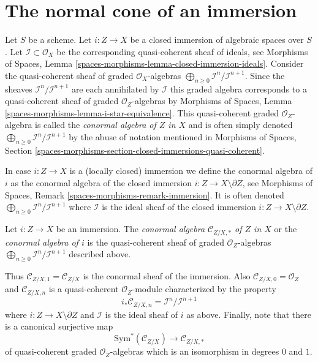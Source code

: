 \section{The normal cone of an immersion}
\label{section-normal-cone}

\noindent
Let $S$ be a scheme. Let $i : Z \to X$ be a closed immersion of algebraic
spaces over $S$. Let $\mathcal{I} \subset \mathcal{O}_X$ be the
corresponding quasi-coherent sheaf of ideals, see
Morphisms of Spaces, Lemma
\ref{spaces-morphisms-lemma-closed-immersion-ideals}.
Consider the quasi-coherent sheaf of graded $\mathcal{O}_X$-algebras
$\bigoplus_{n \geq 0} \mathcal{I}^n/\mathcal{I}^{n + 1}$.
Since the sheaves $\mathcal{I}^n/\mathcal{I}^{n + 1}$
are each annihilated by $\mathcal{I}$ this graded algebra
corresponds to a quasi-coherent sheaf of graded $\mathcal{O}_Z$-algebras by
Morphisms of Spaces, Lemma \ref{spaces-morphisms-lemma-i-star-equivalence}.
This quasi-coherent graded $\mathcal{O}_Z$-algebra is called the
{\it conormal algebra of $Z$ in $X$} and is often simply denoted
$\bigoplus_{n \geq 0} \mathcal{I}^n/\mathcal{I}^{n + 1}$
by the abuse of notation mentioned in
Morphisms of Spaces, Section
\ref{spaces-morphisms-section-closed-immersions-quasi-coherent}.

\medskip\noindent
In case $i : Z \to X$ is a (locally closed) immersion we define the conormal
algebra of $i$ as the conormal algebra of the closed immersion
$i : Z \to X \setminus \partial Z$, see Morphisms of Spaces, Remark
\ref{spaces-morphisms-remark-immersion}.
It is often denoted
$\bigoplus_{n \geq 0} \mathcal{I}^n/\mathcal{I}^{n + 1}$
where $\mathcal{I}$ is the ideal sheaf
of the closed immersion $i : Z \to X \setminus \partial Z$.

\begin{definition}
\label{definition-conormal-algebra}
Let $i : Z \to X$ be an immersion. The {\it conormal algebra
$\mathcal{C}_{Z/X, *}$ of $Z$ in $X$} or the {\it conormal algebra of $i$}
is the quasi-coherent sheaf of graded $\mathcal{O}_Z$-algebras
$\bigoplus_{n \geq 0} \mathcal{I}^n/\mathcal{I}^{n + 1}$ described above.
\end{definition}

\noindent
Thus $\mathcal{C}_{Z/X, 1} = \mathcal{C}_{Z/X}$ is the conormal sheaf
of the immersion. Also $\mathcal{C}_{Z/X, 0} = \mathcal{O}_Z$ and
$\mathcal{C}_{Z/X, n}$ is a quasi-coherent $\mathcal{O}_Z$-module
characterized by the property
\begin{equation}
\label{equation-conormal-in-degree-n}
i_*\mathcal{C}_{Z/X, n} = \mathcal{I}^n/\mathcal{I}^{n + 1}
\end{equation}
where $i : Z \to X \setminus \partial Z$ and $\mathcal{I}$ is the ideal
sheaf of $i$ as above. Finally, note that there is a canonical surjective map
\begin{equation}
\label{equation-conormal-algebra-quotient}
\text{Sym}^*(\mathcal{C}_{Z/X}) \longrightarrow \mathcal{C}_{Z/X, *}
\end{equation}
of quasi-coherent graded $\mathcal{O}_Z$-algebras which is an isomorphism
in degrees $0$ and $1$.

